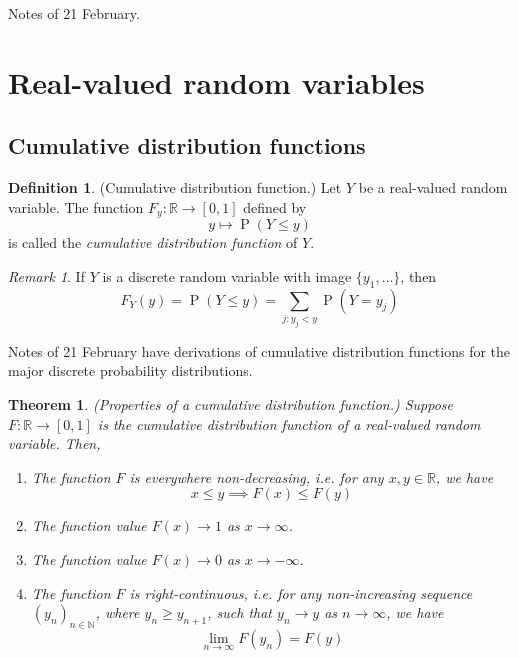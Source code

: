 \documentclass[11pt]{article}
\newtheorem{thm}{Theorem}
\theoremstyle{definition}
\newtheorem{defn}{Definition}[section]
\theoremstyle{remark}
\newtheorem{rem}{Remark}[section]
\newcommand{\parens}[1]{\left(#1\right)}
\newcommand{\R}{\mathbb{R}}
\newcommand{\N}{\mathbb{N}}
\newcommand{\unit}{[0,1]}
\DeclareMathOperator{\Prob}{P}
\renewcommand{\P}[1]{\Prob{\parens{#1}}}
\newcommand{\cdf}{cumulative distribution function}
\begin{document}
Notes of 21 February.

\section{Real-valued random variables}

\subsection{Cumulative distribution functions}

\begin{defn}{(Cumulative distribution function.)}
    \label{def:cdf}
    Let $Y$ be a real-valued random variable.
    The function $F_y : \R \to [0, 1]$ defined by
    \begin{equation}
        \label{eq:cdf}
        y \mapsto \P{Y \leq y}
    \end{equation}
    is called the \emph{cumulative distribution function} of $Y$.
\end{defn}

\begin{rem}
    If $Y$ is a discrete random variable with image $\{y_1, \ldots\}$,
    then
    \begin{equation*}
        F_Y(y)
        = \P{Y \leq y}
        = \sum_{j : y_j < y} {
            \P{Y = y_j}
        }
    \end{equation*}
\end{rem}

Notes of 21 February have derivations of cumulative distribution functions for
the major discrete probability distributions.

\begin{thm}{(Properties of a \cdf.)}
    \label{thm:cdf-properties}
    Suppose $F : \R \to \unit$ is the \cdf{} of a real-valued random variable.
    Then,
    \begin{enumerate}
        \item
            The function $F$ is everywhere non-decreasing,
            i.e. for any $x, y \in \R$, we have
            \begin{equation*}
                x \leq y \implies F(x) \leq F(y)
            \end{equation*}
        \item
            The function value $F(x) \to 1$ as $x \to \infty$.
        \item
            The function value $F(x) \to 0$ as $x \to -\infty$.
        \item
            The function $F$ is right-continuous, i.e.
            for any non-increasing sequence $(y_n)_{n\in\N}$,
            where $y_n \geq y_{n+1}$, such that $y_n \to y$ as $n \to \infty$,
            we have
            \begin{equation}
                \label{eq:cdf-is-right-continuous}
                \lim_{n\to\infty} F(y_n) = F(y)
            \end{equation}
    \end{enumerate}
\end{thm}
\end{document}
